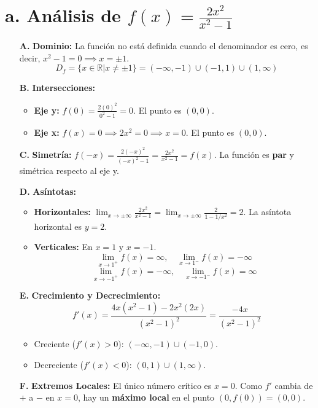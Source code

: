 \documentclass[12pt, letterpaper]{article}
\begin{document}
\section*{a. Análisis de $f(x) = \frac{2x^2}{x^2-1}$}
\begin{enumerate}
    \item[\textbf{A.}] \textbf{Dominio:} La función no está definida cuando el denominador es cero, es decir, $x^2-1=0 \implies x=\pm1$.
    \[ D_f = \{x \in \mathbb{R} | x \neq \pm 1\} = (-\infty, -1) \cup (-1, 1) \cup (1, \infty) \]

    \item[\textbf{B.}] \textbf{Intersecciones:}
    \begin{itemize}
        \item \textbf{Eje y:} $f(0) = \frac{2(0)^2}{0^2-1} = 0$. El punto es $(0,0)$.
        \item \textbf{Eje x:} $f(x) = 0 \implies 2x^2 = 0 \implies x=0$. El punto es $(0,0)$.
    \end{itemize}

    \item[\textbf{C.}] \textbf{Simetría:} $f(-x) = \frac{2(-x)^2}{(-x)^2-1} = \frac{2x^2}{x^2-1} = f(x)$. La función es \textbf{par} y simétrica respecto al eje y.

    \item[\textbf{D.}] \textbf{Asíntotas:}
    \begin{itemize}
        \item \textbf{Horizontales:} $\lim_{x\to\pm\infty} \frac{2x^2}{x^2-1} = \lim_{x\to\pm\infty} \frac{2}{1 - 1/x^2} = 2$. La asíntota horizontal es $y=2$.
        \item \textbf{Verticales:} En $x=1$ y $x=-1$.
        $$ \lim_{x\to1^+} f(x) = \infty, \quad \lim_{x\to1^-} f(x) = -\infty $$
        $$ \lim_{x\to-1^+} f(x) = -\infty, \quad \lim_{x\to-1^-} f(x) = \infty $$
    \end{itemize}

    \item[\textbf{E.}] \textbf{Crecimiento y Decrecimiento:}
    $$ f'(x) = \frac{4x(x^2-1) - 2x^2(2x)}{(x^2-1)^2} = \frac{-4x}{(x^2-1)^2} $$
    \begin{itemize}
        \item Creciente ($f'(x)>0$): $(-\infty, -1) \cup (-1, 0)$.
        \item Decreciente ($f'(x)<0$): $(0, 1) \cup (1, \infty)$.
    \end{itemize}

    \item[\textbf{F.}] \textbf{Extremos Locales:} El único número crítico es $x=0$. Como $f'$ cambia de $+$ a $-$ en $x=0$, hay un \textbf{máximo local} en el punto $(0, f(0)) = (0,0)$.


\end{enumerate}
\end{document}
